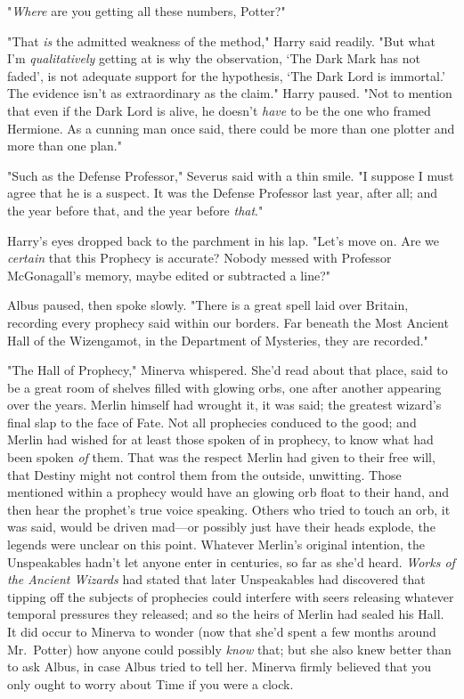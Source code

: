 "\emph{Where} are you getting all these numbers, Potter?"

"That \emph{is} the admitted weakness of the method," Harry said readily. "But
what I'm \emph{qualitatively} getting at is why the observation, `The Dark Mark
has not faded', is not adequate support for the hypothesis, `The Dark Lord is
immortal.' The evidence isn't as extraordinary as the claim." Harry paused.
"Not to mention that even if the Dark Lord is alive, he doesn't \emph{have} to
be the one who framed Hermione. As a cunning man once said, there could be more
than one plotter and more than one plan."

"Such as the Defense Professor," Severus said with a thin smile. "I suppose I
must agree that he is a suspect. It was the Defense Professor last year, after
all; and the year before that, and the year before \emph{that}."

Harry's eyes dropped back to the parchment in his lap. "Let's move on. Are
we \emph{certain} that this Prophecy is accurate? Nobody messed with Professor
McGonagall's memory, maybe edited or subtracted a line?"

Albus paused, then spoke slowly. "There is a great spell laid over Britain,
recording every prophecy said within our borders. Far beneath the Most Ancient
Hall of the Wizengamot, in the Department of Mysteries, they are recorded."

"The Hall of Prophecy," Minerva whispered. She'd read about that place, said to
be a great room of shelves filled with glowing orbs, one after another
appearing over the years. Merlin himself had wrought it, it was said; the
greatest wizard's final slap to the face of Fate. Not all prophecies conduced
to the good; and Merlin had wished for at least those spoken of in prophecy, to
know what had been spoken \emph{of} them. That was the respect Merlin had given
to their free will, that Destiny might not control them from the outside,
unwitting. Those mentioned within a prophecy would have an glowing orb float to
their hand, and then hear the prophet's true voice speaking. Others who tried
to touch an orb, it was said, would be driven mad---or possibly just have their
heads explode, the legends were unclear on this point. Whatever Merlin's
original intention, the Unspeakables hadn't let anyone enter in centuries, so
far as she'd heard. \emph{Works of the Ancient Wizards} had stated that later
Unspeakables had discovered that tipping off the subjects of prophecies could
interfere with seers releasing whatever temporal pressures they released; and
so the heirs of Merlin had sealed his Hall. It did occur to Minerva to wonder
(now that she'd spent a few months around Mr.~Potter) how anyone could possibly
\emph{know} that; but she also knew better than to ask Albus, in case Albus
tried to tell her. Minerva firmly believed that you only ought to worry about
Time if you were a clock.

